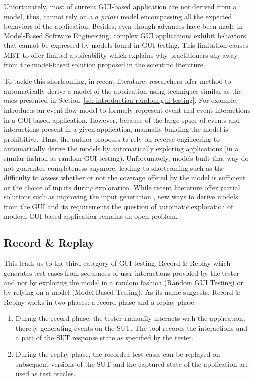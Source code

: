 Unfortunately, most of current GUI-based application are not derived from a model, thus, cannot rely on a \emph{a priori} model encompassing all the expected behaviors of the application. Besides, even though advances have been made in Model-Based Software Engineering, complex GUI applications exhibit behaviors that cannot be expressed by models found in GUI testing. This limitation causes MBT to offer limited applicability which explains why practitioners shy away from the model-based solution proposed in the scientific literature.

To tackle this shortcoming, in recent literature, researchers offer method to automatically derive a model of the application using techniques similar as the ones presented in Section~\ref{sec:introduction-random-gui-testing}. For example, \textcite{Memon2007} introduces an event-flow model to formally represent event and event interactions in a GUI-based application. However, because of the large space of events and interactions present in a given application, manually building the model is prohibitive. Thus, the author proposes to rely on reverse-engineering to automatically derive the models by automatically exploring applications (in a similar fashion as random GUI testing). Unfortunately, models built that way do not guarantee completeness anymore, leading to shortcoming such as the difficulty to assess whether or not the coverage offered by the model is sufficient or the choice of inputs during exploration. While recent literature offer partial solutions such as improving the input generation \cite{Biagiola2019}, new ways to derive models from the GUI and its requirements \cite{Canny2020} the question of automatic exploration of modern GUI-based application remains an open problem.

\subsection{Record \& Replay}
\label{sec:introduction-record-and-replay}

This leads us to the third category of GUI testing, Record \& Replay which generates test cases from sequences of user interactions provided by the tester and not by exploring the model in a random fashion (Random GUI Testing) or by relying on a model (Model-Based Testing). As its name suggests, Record \& Replay works in two phases: a record phase and a replay phase:

\begin{enumerate}
    \item During the record phase, the tester manually interacts with the application, thereby generating events on the SUT. The tool records the interactions and a part of the SUT response state as specified by the tester.
    \item During the replay phase, the recorded test cases can be replayed on subsequent versions of the SUT and the captured state of the application are used as test oracles.
\end{enumerate}

